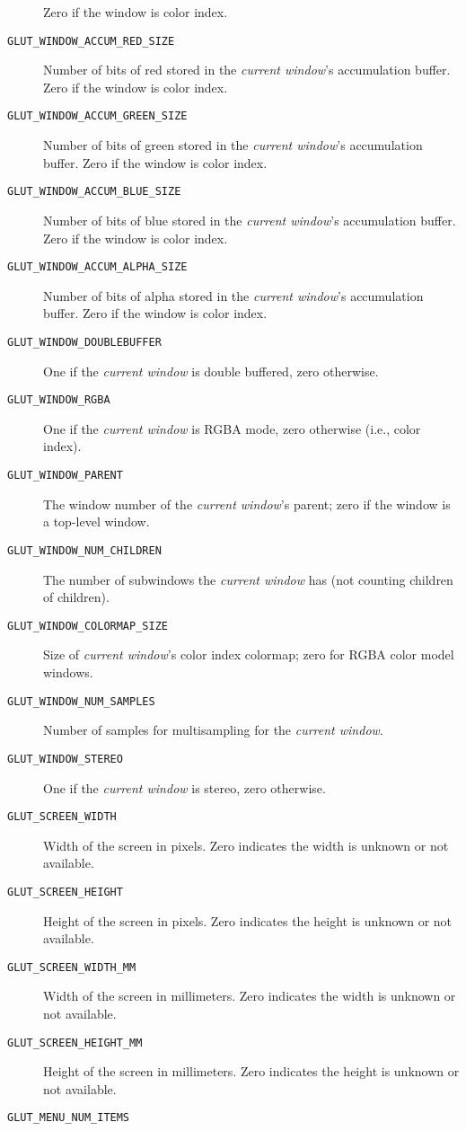 \begin{description}
Zero if the window is color index.
\item[\tt GLUT\_WINDOW\_ACCUM\_RED\_SIZE]
Number of bits of red stored in the {\em current window}'s accumulation buffer.
Zero if the window is color index.
\item[\tt GLUT\_WINDOW\_ACCUM\_GREEN\_SIZE]
Number of bits of green stored in the {\em current window}'s accumulation buffer.
Zero if the window is color index.
\item[\tt GLUT\_WINDOW\_ACCUM\_BLUE\_SIZE]
Number of bits of blue stored in the {\em current window}'s accumulation buffer.
Zero if the window is color index.
\item[\tt GLUT\_WINDOW\_ACCUM\_ALPHA\_SIZE]
Number of bits of alpha stored in the {\em current window}'s accumulation buffer.
Zero if the window is color index.
\item[\tt GLUT\_WINDOW\_DOUBLEBUFFER]
One if the {\em current window} is double buffered, zero otherwise.
\item[\tt GLUT\_WINDOW\_RGBA]
One if the {\em current window} is RGBA mode, zero otherwise (i.e., color index).
\item[\tt GLUT\_WINDOW\_PARENT]
The window number of the {\em current window}'s parent; zero if the window is a top-level window.
\item[\tt GLUT\_WINDOW\_NUM\_CHILDREN]
The number of subwindows the {\em current window} has (not counting children of children).
\item[\tt GLUT\_WINDOW\_COLORMAP\_SIZE]
Size of {\em current window}'s color index colormap; zero for RGBA color model windows.
\item[\tt GLUT\_WINDOW\_NUM\_SAMPLES]
Number of samples for multisampling for the {\em current window}.
\item[\tt GLUT\_WINDOW\_STEREO]
One if the {\em current window} is stereo, zero otherwise.
\item[\tt GLUT\_SCREEN\_WIDTH]
Width of the screen in pixels.
Zero indicates the width is unknown or not available.
\item[\tt GLUT\_SCREEN\_HEIGHT]
Height of the screen in pixels.
Zero indicates the height is unknown or not available.
\item[\tt GLUT\_SCREEN\_WIDTH\_MM]
Width of the screen in millimeters.
Zero indicates the width is unknown or not available.
\item[\tt GLUT\_SCREEN\_HEIGHT\_MM]
Height of the screen in millimeters.
Zero indicates the height is unknown or not available.
\item[\tt GLUT\_MENU\_NUM\_ITEMS]

\end{description}
